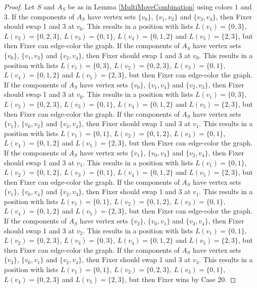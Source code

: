 \documentclass[12pt]{amsart}
\theoremstyle{plain}
\theoremstyle{definition}
\theoremstyle{remark}
\begin{document}
\begin{proof}
Let $S$ and $A_S$ be as in Lemma \ref{MultiMoveCombination} using colors $1$ and $3$. If the components of $A_S$ have vertex sets $\{v_0\}$, $\{v_1, v_2\}$ and $\{v_3, v_4\}$, then Fixer should swap 1 and 3 at $v_0$. This results in a position with lists $L(v_1) = \{0, 3\}$, $L(v_2) = \{0, 2, 3\}$, $L(v_3) = \{0, 1\}$, $L(v_4) = \{0, 1, 2\}$ and $L(v_5) = \{2, 3\}$, but then Fixer can edge-color the graph.
If the components of $A_S$ have vertex sets $\{v_0\}$, $\{v_1, v_3\}$ and $\{v_2, v_4\}$, then Fixer should swap 1 and 3 at $v_0$. This results in a position with lists $L(v_1) = \{0, 3\}$, $L(v_2) = \{0, 2, 3\}$, $L(v_3) = \{0, 1\}$, $L(v_4) = \{0, 1, 2\}$ and $L(v_5) = \{2, 3\}$, but then Fixer can edge-color the graph.
If the components of $A_S$ have vertex sets $\{v_0\}$, $\{v_1, v_4\}$ and $\{v_2, v_3\}$, then Fixer should swap 1 and 3 at $v_0$. This results in a position with lists $L(v_1) = \{0, 3\}$, $L(v_2) = \{0, 2, 3\}$, $L(v_3) = \{0, 1\}$, $L(v_4) = \{0, 1, 2\}$ and $L(v_5) = \{2, 3\}$, but then Fixer can edge-color the graph.
If the components of $A_S$ have vertex sets $\{v_1\}$, $\{v_0, v_2\}$ and $\{v_3, v_4\}$, then Fixer should swap 1 and 3 at $v_1$. This results in a position with lists $L(v_1) = \{0, 1\}$, $L(v_2) = \{0, 1, 2\}$, $L(v_3) = \{0, 1\}$, $L(v_4) = \{0, 1, 2\}$ and $L(v_5) = \{2, 3\}$, but then Fixer can edge-color the graph.
If the components of $A_S$ have vertex sets $\{v_1\}$, $\{v_0, v_3\}$ and $\{v_2, v_4\}$, then Fixer should swap 1 and 3 at $v_1$. This results in a position with lists $L(v_1) = \{0, 1\}$, $L(v_2) = \{0, 1, 2\}$, $L(v_3) = \{0, 1\}$, $L(v_4) = \{0, 1, 2\}$ and $L(v_5) = \{2, 3\}$, but then Fixer can edge-color the graph.
If the components of $A_S$ have vertex sets $\{v_1\}$, $\{v_0, v_4\}$ and $\{v_2, v_3\}$, then Fixer should swap 1 and 3 at $v_1$. This results in a position with lists $L(v_1) = \{0, 1\}$, $L(v_2) = \{0, 1, 2\}$, $L(v_3) = \{0, 1\}$, $L(v_4) = \{0, 1, 2\}$ and $L(v_5) = \{2, 3\}$, but then Fixer can edge-color the graph.
If the components of $A_S$ have vertex sets $\{v_2\}$, $\{v_0, v_1\}$ and $\{v_3, v_4\}$, then Fixer should swap 1 and 3 at $v_2$. This results in a position with lists $L(v_1) = \{0, 1\}$, $L(v_2) = \{0, 2, 3\}$, $L(v_3) = \{0, 3\}$, $L(v_4) = \{0, 1, 2\}$ and $L(v_5) = \{2, 3\}$, but then Fixer can edge-color the graph.
If the components of $A_S$ have vertex sets $\{v_3\}$, $\{v_0, v_1\}$ and $\{v_2, v_4\}$, then Fixer should swap 1 and 3 at $v_3$. This results in a position with lists $L(v_1) = \{0, 1\}$, $L(v_2) = \{0, 2, 3\}$, $L(v_3) = \{0, 1\}$, $L(v_4) = \{0, 2, 3\}$ and $L(v_5) = \{2, 3\}$, but then Fixer wins by Case 20.

\end{proof}
\end{document}
